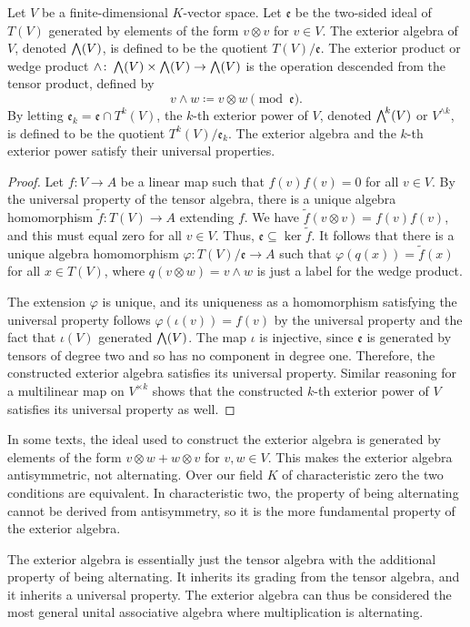 \documentclass[a4paper,12pt]{article}
\begin{document}
\begin{proposition}\label{prop:exterior_algebra_construction_satisfies_universal_property}
    Let $V$ be a finite-dimensional $K$-vector space.
    Let $\mathfrak{e}$ be the two-sided ideal of $T(V)$ generated by elements of the form $v \otimes v$ for $v \in V$.
    The exterior algebra of $V$, denoted $\extp(V)$, is defined to be the quotient $T(V) / \mathfrak{e}$.
    The exterior product or wedge product $\wedge \colon \extp(V) \times \extp(V) \to \extp(V)$ is the operation descended from the tensor product, defined by
    \begin{equation}
        v \wedge w \coloneq v \otimes w \pmod{\mathfrak{e}}.
    \end{equation}
    By letting $\mathfrak{e}_k = \mathfrak{e} \cap T^k(V)$, the $k$-th exterior power of $V$, denoted $\extp^k(V)$ or $V^{\wedge k}$, is defined to be the quotient $T^k(V) / \mathfrak{e}_k$.
    The exterior algebra and the $k$-th exterior power satisfy their universal properties.
\end{proposition}
\begin{proof}
    Let $f \colon V \to A$ be a linear map such that $f(v)f(v) = 0$ for all $v \in V$.
    By the universal property of the tensor algebra, there is a unique algebra homomorphism $\tilde{f} \colon T(V) \to A$ extending $f$.
    We have $\tilde{f}(v \otimes v) = f(v)f(v)$, and this must equal zero for all $v \in V$.
    Thus, $\mathfrak{e} \subseteq \ker \tilde{f}$.
    It follows that there is a unique algebra homomorphism $\varphi \colon T(V) / \mathfrak{e} \to A$ such that $\varphi(q(x)) = \tilde{f}(x)$ for all $x \in T(V)$, where $q(v \otimes w) = v \wedge w$ is just a label for the wedge product.
    
    The extension $\varphi$ is unique, and its uniqueness as a homomorphism satisfying the universal property follows $\varphi(\iota(v)) = f(v)$ by the universal property and the fact that $\iota(V)$ generated $\extp(V)$.
    The map $\iota$ is injective, since $\mathfrak{e}$ is generated by tensors of degree two and so has no component in degree one.
    Therefore, the constructed exterior algebra satisfies its universal property.
    Similar reasoning for a multilinear map on $V^{\times k}$ shows that the constructed $k$-th exterior power of $V$ satisfies its universal property as well.
\end{proof}
\begin{remark}
    In some texts, the ideal used to construct the exterior algebra is generated by elements of the form $v \otimes w + w \otimes v$ for $v, w \in V$.
    This makes the exterior algebra antisymmetric, not alternating.
    Over our field $K$ of characteristic zero the two conditions are equivalent.
    In characteristic two, the property of being alternating cannot be derived from antisymmetry, so it is the more fundamental property of the exterior algebra.
\end{remark}
The exterior algebra is essentially just the tensor algebra with the additional property of being alternating.
It inherits its grading from the tensor algebra, and it inherits a universal property.
The exterior algebra can thus be considered the most general unital associative algebra where multiplication is alternating.
\end{document}
